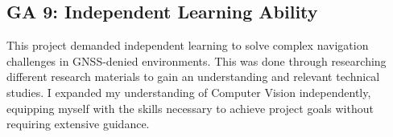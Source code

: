 \subsection*{GA 9: Independent Learning Ability}
This project demanded independent learning to solve complex navigation challenges in GNSS-denied environments. This was done through researching different research materials to gain an understanding and relevant technical studies. I expanded my understanding of Computer Vision independently, equipping myself with the skills necessary to achieve project goals without requiring extensive guidance.
